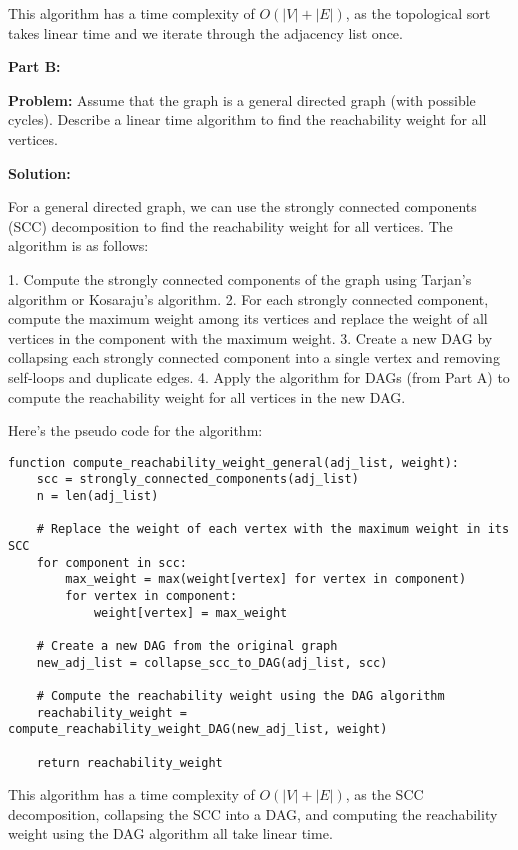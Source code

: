\documentclass[11pt]{article}
\begin{document}
    This algorithm has a time complexity of $O(|V| + |E|)$, as the topological sort takes linear time and we iterate through the adjacency list once.

    \textbf{Part B:}

    \textbf{Problem:} Assume that the graph is a general directed graph (with possible cycles). Describe a linear time algorithm to find the reachability weight for all vertices.

    \textbf{Solution:}

    For a general directed graph, we can use the strongly connected components (SCC) decomposition to find the reachability weight for all vertices. The algorithm is as follows:

    1. Compute the strongly connected components of the graph using Tarjan's algorithm or Kosaraju's algorithm.
    2. For each strongly connected component, compute the maximum weight among its vertices and replace the weight of all vertices in the component with the maximum weight.
    3. Create a new DAG by collapsing each strongly connected component into a single vertex and removing self-loops and duplicate edges.
    4. Apply the algorithm for DAGs (from Part A) to compute the reachability weight for all vertices in the new DAG.

    Here's the pseudo code for the algorithm:

    \begin{verbatim}
function compute_reachability_weight_general(adj_list, weight):
    scc = strongly_connected_components(adj_list)
    n = len(adj_list)

    # Replace the weight of each vertex with the maximum weight in its SCC
    for component in scc:
        max_weight = max(weight[vertex] for vertex in component)
        for vertex in component:
            weight[vertex] = max_weight

    # Create a new DAG from the original graph
    new_adj_list = collapse_scc_to_DAG(adj_list, scc)

    # Compute the reachability weight using the DAG algorithm
    reachability_weight = compute_reachability_weight_DAG(new_adj_list, weight)

    return reachability_weight
    \end{verbatim}

    This algorithm has a time complexity of $O(|V| + |E|)$, as the SCC decomposition, collapsing the SCC into a DAG, and computing the reachability weight using the DAG algorithm all take linear time.
\end{document}
